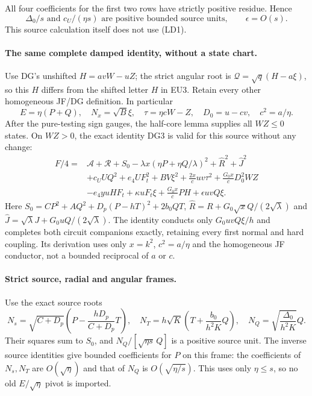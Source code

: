 All four coefficients for the first two rows have strictly positive
residue. Hence
\[
 \Delta_0/s\text{ and }c_U/(\eta s)
       \text{ are positive bounded source units},\qquad
 \epsilon=O(s).                                      \tag{LD8}
\]
This source calculation itself does not use (LD1).

\paragraph{The same complete damped identity, without a state chart.}
Use DG's unshifted $H=avW-uZ$; the strict angular root is
$\mathcal Q=\sqrt q(H-a\xi)$, so this $H$ differs from the
shifted letter $H$ in EU3. Retain every other homogeneous JF/DG
definition. In particular
\[
 E=\eta(P+Q),\quad N_x=\sqrt B\xi,\quad
 \tau=\eta cW-Z,\quad D_0=u-cv,\quad c^2=a/\eta.
\]
After the pure-testing sign gauges, the half-core lemma supplies all
$WZ\le0$ states. On $WZ>0$, the exact identity DG3 is valid for
this source without any change:
\[
\begin{split}
 F/4={}&\mathscr A+\mathscr R+S_0
       -\lambda x(\eta P+\eta Q/\lambda)^2
       +\widehat R^2+\widehat J^2\\
 &+c_UUQ^2+e_4UF_t^2+BV\xi^2
       +\frac{2x}{c}uv\tau^2+\frac{G_0x}{c}D_0^2WZ\\
 &-e_4yuHF_t+\kappa uF_t\xi
       +\frac{G_0x}{c}PH+\epsilon uvQ\xi.             
\end{split}\tag{LD9}
\]
Here $S_0=CP^2+AQ^2+D_p(P-hT)^2+2b_0QT$,
$\widehat R=R+G_0\sqrt xQ/(2\sqrt\lambda)$ and
$\widehat J=\sqrt\lambda J+G_0uQ/(2\sqrt\lambda)$.
The identity conducts only $G_0uvQ\xi/h$ and completes both
circuit companions exactly, retaining every first normal and hard
coupling. Its derivation uses only $x=k^2$, $c^2=a/\eta$ and the
homogeneous JF conductor, not a bounded reciprocal of $a$ or $c$.

\paragraph{Strict source, radial and angular frames.}
Use the exact source roots
\[
 N_s=\sqrt{C+D_p}\left(P-\frac{hD_p}{C+D_p}T\right),
 \quad N_T=h\sqrt K\left(T+\frac{b_0}{h^2K}Q\right),
 \quad N_Q=\sqrt{\frac{\Delta_0}{h^2K}}Q.            \tag{LD10}
\]
Their squares sum to $S_0$, and
$N_Q/[\sqrt{\eta s}\,Q]$ is a positive source unit.
The inverse source identities give bounded coefficients for $P$
on this frame: the coefficients of $N_s,N_T$ are $O(\sqrt\eta)$
and that of $N_Q$ is $O(\sqrt{\eta/s})$. This uses only
$\eta\le s$, so no old $E/\sqrt\eta$ pivot is imported.

